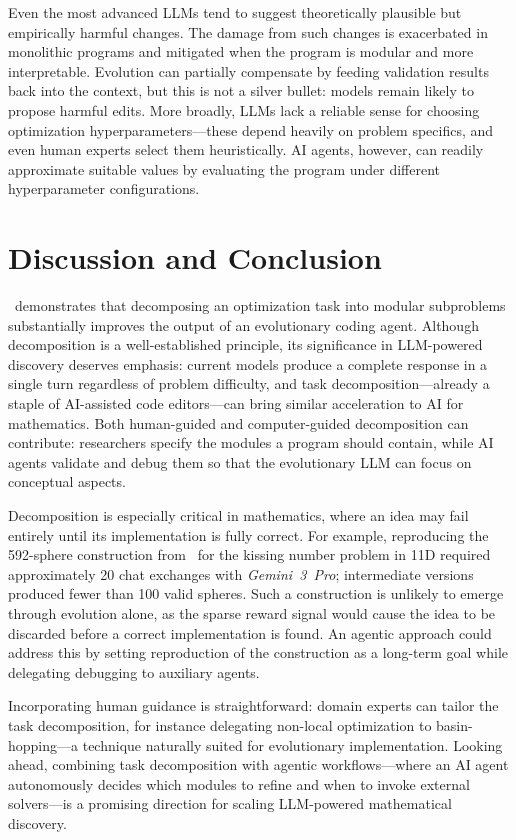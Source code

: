 \documentclass[sigconf]{acmart}
\begin{document}
Even the most advanced LLMs tend to suggest theoretically plausible but empirically harmful changes. The damage from such changes is exacerbated in monolithic programs and mitigated when the program is modular and more interpretable. Evolution can partially compensate by feeding validation results back into the context, but this is not a silver bullet: models remain likely to propose harmful edits. More broadly, LLMs lack a reliable sense for choosing optimization hyperparameters---these depend heavily on problem specifics, and even human experts select them heuristically. AI agents, however, can readily approximate suitable values by evaluating the program under different hyperparameter configurations.

\section{Discussion and Conclusion}
\improvevolve\ demonstrates that decomposing an optimization task into modular subproblems substantially improves the output of an evolutionary coding agent. Although decomposition is a well-established principle, its significance in LLM-powered discovery deserves emphasis: current models produce a complete response in a single turn regardless of problem difficulty, and task decomposition---already a staple of AI-assisted code editors---can bring similar acceleration to AI for mathematics. Both human-guided and computer-guided decomposition can contribute: researchers specify the modules a program should contain, while AI agents validate and debug them so that the evolutionary LLM can focus on conceptual aspects.

Decomposition is especially critical in mathematics, where an idea may fail entirely until its implementation is fully correct. For example, reproducing the 592-sphere construction from~\citet{ganzhinov2022highlysymmetriclines} for the kissing number problem in 11D required approximately 20 chat exchanges with \emph{Gemini~3~Pro}; intermediate versions produced fewer than 100 valid spheres. Such a construction is unlikely to emerge through evolution alone, as the sparse reward signal would cause the idea to be discarded before a correct implementation is found. An agentic approach could address this by setting reproduction of the construction as a long-term goal while delegating debugging to auxiliary agents.

Incorporating human guidance is straightforward: domain experts can tailor the task decomposition, for instance delegating non-local optimization to basin-hopping---a technique naturally suited for evolutionary implementation. Looking ahead, combining task decomposition with agentic workflows---where an AI agent autonomously decides which modules to refine and when to invoke external solvers---is a promising direction for scaling LLM-powered mathematical discovery.
\end{document}

